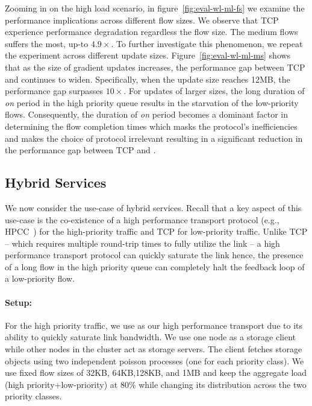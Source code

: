 Zooming in on the high load scenario, in figure~\ref{fig:eval-wl-ml-fs} we examine the performance implications across different flow sizes. We observe that TCP experience performance degradation regardless the flow size. The medium flows suffers the most, up-to $4.9\times$.
To further investigate this phenomenon, we repeat the experiment across different update sizes. 
Figure~\ref{fig:eval-wl-ml-ms} shows that as the size of gradient updates increases, the performance gap between TCP and \nearopt{} continues to widen. Specifically, when the update size reaches 12MB, the performance gap surpasses $10\times$. For updates of larger sizes, the long duration of \emph{on} period in the high priority queue results in the starvation of the low-priority flows. Consequently, the duration of \emph{on} period becomes a dominant factor in determining the flow completion times which masks the protocol's inefficiencies and makes the choice of protocol irrelevant resulting in a significant reduction in the performance gap between TCP and \nearopt{}.


\subsection{\textbf{Hybrid Services}}\label{subsubsec:eval-hybservice}
\label{sec:eval-hybserv}
We now consider the use-case of hybrid services.
Recall that a key aspect of this use-case is the co-existence of a high performance transport protocol (e.g., HPCC~\cite{hpcc}) for the high-priority traffic and TCP for low-priority traffic.
Unlike TCP -- which requires multiple round-trip times to fully utilize the link -- a high performance transport protocol can quickly saturate the link hence, the presence of a long flow in the high priority queue can completely halt the feedback loop of a low-priority flow.

\paragraph{Setup:}
For the high priority traffic, we use \nearopt{} as our high performance transport due to its ability to quickly saturate link bandwidth.
We use one node as a storage client while other nodes in the cluster act as storage servers.
The client fetches storage objects using two independent poisson processes (one for each priority class).
We use fixed flow sizes of 32KB, 64KB,128KB, and 1MB and keep the aggregate load (high priority+low-priority) at 80\% while changing its distribution across the two priority classes.

